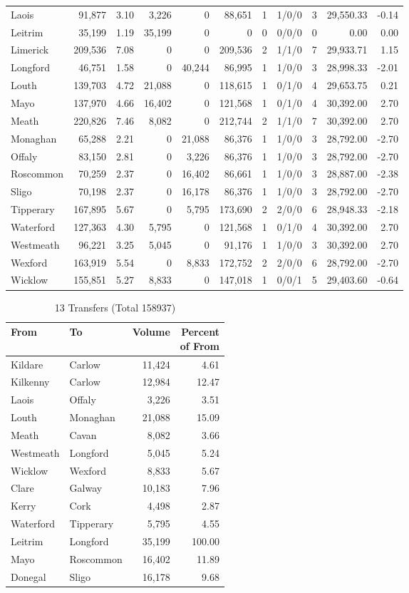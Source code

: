 \documentclass[a4paper]{article}
\begin{document}
\begin{longtable}{lrrrrrrlrrr}
Laois&91,877& 3.10&3,226&0&88,651&1&1/0/0&3&29,550.33&-0.14\\ 
Leitrim&35,199& 1.19&35,199&0&0&0&0/0/0&0& 0.00& 0.00\\ 
Limerick&209,536& 7.08&0&0&209,536&2&1/1/0&7&29,933.71& 1.15\\ 
Longford&46,751& 1.58&0&40,244&86,995&1&1/0/0&3&28,998.33&-2.01\\ 
Louth&139,703& 4.72&21,088&0&118,615&1&0/1/0&4&29,653.75& 0.21\\ 
Mayo&137,970& 4.66&16,402&0&121,568&1&0/1/0&4&30,392.00& 2.70\\ 
Meath&220,826& 7.46&8,082&0&212,744&2&1/1/0&7&30,392.00& 2.70\\ 
Monaghan&65,288& 2.21&0&21,088&86,376&1&1/0/0&3&28,792.00&-2.70\\ 
Offaly&83,150& 2.81&0&3,226&86,376&1&1/0/0&3&28,792.00&-2.70\\ 
Roscommon&70,259& 2.37&0&16,402&86,661&1&1/0/0&3&28,887.00&-2.38\\ 
Sligo&70,198& 2.37&0&16,178&86,376&1&1/0/0&3&28,792.00&-2.70\\ 
Tipperary&167,895& 5.67&0&5,795&173,690&2&2/0/0&6&28,948.33&-2.18\\ 
Waterford&127,363& 4.30&5,795&0&121,568&1&0/1/0&4&30,392.00& 2.70\\ 
Westmeath&96,221& 3.25&5,045&0&91,176&1&1/0/0&3&30,392.00& 2.70\\ 
Wexford&163,919& 5.54&0&8,833&172,752&2&2/0/0&6&28,792.00&-2.70\\ 
Wicklow&155,851& 5.27&8,833&0&147,018&1&0/0/1&5&29,403.60&-0.64\\ 
\end{longtable}

\begin{table}[htbp]
\caption{13 Transfers (Total 158937)}
\centering
\begin{tabular}{llrr} \toprule
From &To &Volume &\shortstack{Percent\\of From} \\ \midrule
Kildare&Carlow&11,424& 4.61\\ 
Kilkenny&Carlow&12,984&12.47\\ 
Laois&Offaly&3,226& 3.51\\ 
Louth&Monaghan&21,088&15.09\\ 
Meath&Cavan&8,082& 3.66\\ 
Westmeath&Longford&5,045& 5.24\\ 
Wicklow&Wexford&8,833& 5.67\\ 
Clare&Galway&10,183& 7.96\\ 
Kerry&Cork&4,498& 2.87\\ 
Waterford&Tipperary&5,795& 4.55\\ 
Leitrim&Longford&35,199&100.00\\ 
Mayo&Roscommon&16,402&11.89\\ 
Donegal&Sligo&16,178& 9.68\\ 
\bottomrule
\end{tabular}
\end{table}
\end{document}

